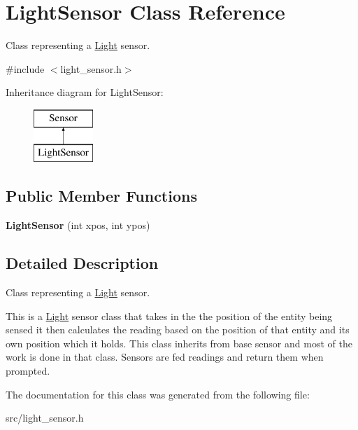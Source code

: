 \hypertarget{class_light_sensor}{}\section{Light\+Sensor Class Reference}
\label{class_light_sensor}


Class representing a \mbox{\hyperlink{class_light}{Light}} sensor.  




{\ttfamily \#include $<$light\+\_\+sensor.\+h$>$}

Inheritance diagram for Light\+Sensor\+:\begin{figure}[H]
\begin{center}
\leavevmode
\includegraphics[height=2.000000cm]{class_light_sensor}
\end{center}
\end{figure}
\subsection*{Public Member Functions}
\begin{DoxyCompactItemize}
\item 
\mbox{\label{class_light_sensor_af5ec9461f434abd6558e0e63d60e8912}} 
{\bfseries Light\+Sensor} (int xpos, int ypos)
\end{DoxyCompactItemize}


\subsection{Detailed Description}
Class representing a \mbox{\hyperlink{class_light}{Light}} sensor. 

This is a \mbox{\hyperlink{class_light}{Light}} sensor class that takes in the the position of the entity being sensed it then calculates the reading based on the position of that entity and its own position which it holds. This class inherits from base sensor and most of the work is done in that class. Sensors are fed readings and return them when prompted. 

The documentation for this class was generated from the following file\+:\begin{DoxyCompactItemize}
\item 
src/light\+\_\+sensor.\+h\end{DoxyCompactItemize}
